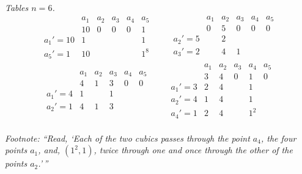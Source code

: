 \documentclass[11pt]{article}
\begin{document}
\noindent\textit{Tables $n=6$.}
\[
\begin{array}{l|ccccc}
              & a_{1} & a_{2} & a_{3} & a_{4} & a_{5}\\
              & 10    & 0     & 0     & 0     & 1\\
\hline
a_{1}'=10     & 1     &       &       &       & 1\\
a_{5}'=1      & 10    &       &       &       & 1^{8}
\end{array}
\qquad
\begin{array}{l|ccccc}
              & a_{1} & a_{2} & a_{3} & a_{4} & a_{5}\\
              & 0     & 5     & 0     & 0     & 0\\
\hline
a_{2}'=5      &       & 2     &       &       & \\
a_{3}'=2      &       & 4     & 1     &       & \\
\end{array}
\]
\[
\begin{array}{l|ccccc}
              & a_{1} & a_{2} & a_{3} & a_{4} & a_{5}\\
              & 4     & 1     & 3     & 0     & 0\\
\hline
a_{1}'=4      & 1     &       & 1     &       & \\
a_{2}'=1      & 4     & 1     & 3     &       & \\
\end{array}
\qquad
\begin{array}{l|ccccc}
              & a_{1} & a_{2} & a_{3} & a_{4} & a_{5}\\
              & 3     & 4     & 0     & 1     & 0\\
\hline
a_{1}'=3      & 2     & 4     &       & 1     & \\
a_{2}'=4      & 1     & 4     &       & 1     & \\
a_{4}'=1      & 2     & 4     &       & 1^{2}& \\
\end{array}
\]

\noindent\textit{Footnote: ``Read, `Each of the two cubics passes through
the point $a_{4}$, the four points $a_{1}$, and, $(1^{2},1)$, twice
through one and once through the other of the points $a_{2}$.'\,''}

\end{document}
